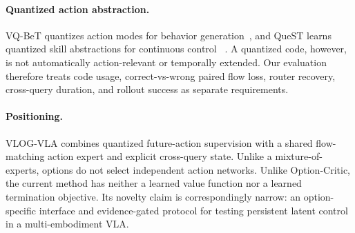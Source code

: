 \paragraph{Quantized action abstraction.}
VQ-BeT quantizes action modes for behavior generation~\citep{lee2024vqbet},
and QueST learns quantized skill abstractions for continuous control
~\citep{mete2024quest}.  A quantized code, however, is not automatically
action-relevant or temporally extended.  Our evaluation therefore treats
code usage, correct-vs-wrong paired flow loss, router recovery, cross-query
duration, and rollout success as separate requirements.



\paragraph{Positioning.}
VLOG-VLA combines quantized future-action supervision with a shared
flow-matching action expert and explicit cross-query state.  Unlike a
mixture-of-experts, options do not select independent action networks.  Unlike
Option-Critic, the current method has neither a learned value function nor a
learned termination objective.  Its novelty claim is correspondingly narrow:
an option-specific interface and evidence-gated protocol for testing persistent
latent control in a multi-embodiment VLA.
